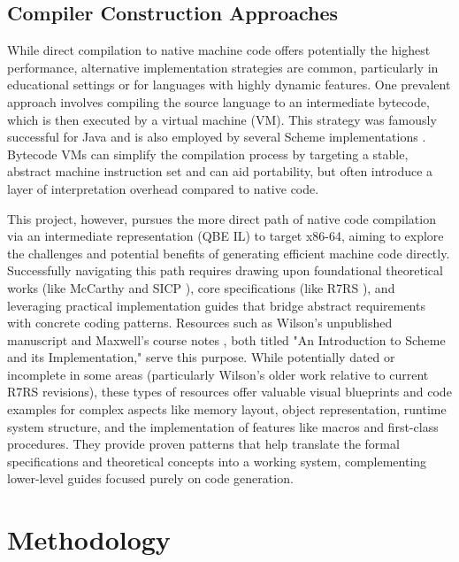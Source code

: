 \documentclass[final]{cmpreport_02}
\begin{document}
\subsection{Compiler Construction Approaches}

While direct compilation to native machine code offers potentially the highest performance, alternative implementation strategies are common, particularly in educational settings or for languages with highly dynamic features. One prevalent approach involves compiling the source language to an intermediate bytecode, which is then executed by a virtual machine (VM). This strategy was famously successful for Java \cite{oracle2024java} and is also employed by several Scheme implementations \cite{SchemeImplementations}. Bytecode VMs can simplify the compilation process by targeting a stable, abstract machine instruction set and can aid portability, but often introduce a layer of interpretation overhead compared to native code.

This project, however, pursues the more direct path of native code compilation via an intermediate representation (QBE IL) to target x86-64, aiming to explore the challenges and potential benefits of generating efficient machine code directly. Successfully navigating this path requires drawing upon foundational theoretical works (like McCarthy \cite{mccarthy1960recursive} and SICP \cite{structureandinterp}), core specifications (like R7RS \cite{r7rs}), and leveraging practical implementation guides that bridge abstract requirements with concrete coding patterns. Resources such as Wilson's unpublished manuscript \cite{wilson1996introduction} and Maxwell's course notes \cite{intro_scheme}, both titled "An Introduction to Scheme and its Implementation," serve this purpose. While potentially dated or incomplete in some areas (particularly Wilson's older work relative to current R7RS revisions), these types of resources offer valuable visual blueprints and code examples for complex aspects like memory layout, object representation, runtime system structure, and the implementation of features like macros and first-class procedures. They provide proven patterns that help translate the formal specifications and theoretical concepts into a working system, complementing lower-level guides focused purely on code generation.


\section{Methodology}
\end{document}
